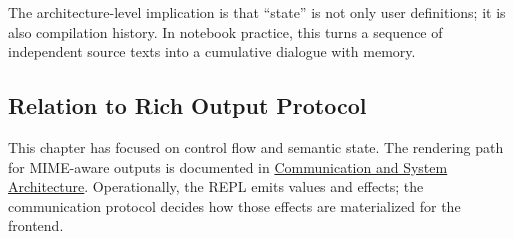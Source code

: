 The architecture-level implication is that ``state'' is not only user definitions; it is also compilation history. In notebook practice, this turns a sequence of independent source texts into a cumulative dialogue with memory.

\subsection{Relation to Rich Output Protocol}

This chapter has focused on control flow and semantic state. The rendering path for MIME-aware outputs is documented in \hyperref[sec:communication]{Communication and System Architecture}. Operationally, the REPL emits values and effects; the communication protocol decides how those effects are materialized for the frontend.
